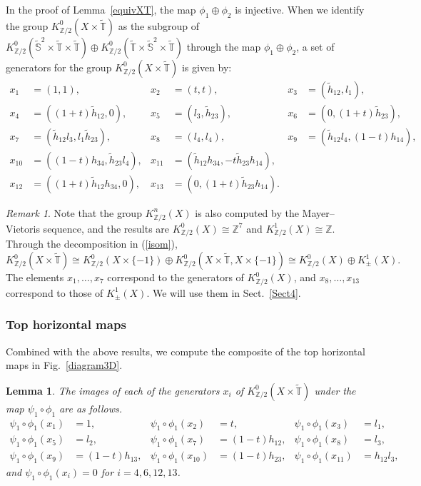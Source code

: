 \documentclass{amsart}
\theoremstyle{plain}
\newtheorem{lemma}[theorem]{Lemma}
\theoremstyle{definition}
\theoremstyle{remark}
\newtheorem{remark}[theorem]{Remark}
\newcommand{\Z}{\mathbb{Z}}
\newcommand{\T}{\mathbb{T}}
\newcommand{\SSS}{\mathbb{S}}
\newcommand{\tT}{\widetilde{\T}}
\newcommand{\tS}{\widetilde{\SSS}}
\newcommand{\thh}{\tilde{h}}
\begin{document}
In the proof of Lemma~\ref{equivXT}, the map $\phi_1 \oplus \phi_2$ is injective.
When we identify the group $K^0_{\Z/2}(X \times \tT)$ as the subgroup of $K^0_{\Z/2}(\tS^2 \times \tT \times \tT) \oplus K^0_{\Z/2}(\tT \times \tS^2 \times \tT)$ through the map $\phi_1 \oplus \phi_2$, a set of generators for the group $K^0_{\Z/2}(X \times \tT)$ is given by:
\begin{align*}
x_1 &= (1,1), &
x_2 &= (t, t), &
x_3 &= (\thh_{12}, l_1),
\\
x_4 &= ((1+t)\thh_{12},0), &
x_5 &= (l_3, \thh_{23}), &
x_6 &= (0, (1+t)\thh_{23}),
\\
x_7 &= (\thh_{12}l_3, l_1 \thh_{23}), &
x_8 &= (l_4, l_4), &
x_9 &= (\thh_{12} l_4, (1-t)h_{14}),
\\
x_{10} &= ((1-t)h_{34}, \thh_{23}l_4), &
x_{11} &= (\thh_{12}h_{34}, -t \thh_{23}h_{14}), & &
\\
x_{12} &= ((1+t)\thh_{12}h_{34},0),
& x_{13} &= (0, (1+t) \thh_{23}h_{14}). &
\end{align*}

\begin{remark}
\label{rem3.14}
Note that the group $K^n_{\Z/2}(X)$ is also computed by the Mayer--Vietoris sequence, and the results are $K^0_{\Z/2}(X) \cong \Z^7$ and $K^1_{\Z/2}(X) \cong \Z$.
Through the decomposition in (\ref{isom}),
\begin{equation*}
	K^0_{\Z/2}(X \times \tT) \cong K^0_{\Z/2}(X \times \{ -1 \}) \oplus K^0_{\Z/2}(X \times \tT, X \times \{-1\})
		\cong K^0_{\Z/2}(X) \oplus K^1_\pm(X).
\end{equation*}
The elements $x_1, \ldots, x_7$ correspond to the generators of $K^0_{\Z/2}(X)$, and $x_8, \ldots, x_{13}$ correspond to those of $K^1_\pm(X)$. We will use them in Sect.~\ref{Sect4}.
\end{remark}

\subsubsection{Top horizontal maps}
Combined with the above results, we compute the composite of the top horizontal maps in Fig.~\ref{diagram3D}.

\begin{lemma}
\label{image3D}
The images of each of the generators $x_i$ of $K^0_{\Z/2}(X \times \tT)$ under the map $\psi_1 \circ \phi_1$ are as follows.
\begin{align*}
\psi_1 \circ \phi_1 (x_1) &= 1, &
\psi_1 \circ \phi_1 (x_2) &= t, &
\psi_1 \circ \phi_1 (x_3) &= l_1,
\\
\psi_1 \circ \phi_1 (x_5) &= l_2, &
\psi_1 \circ \phi_1 (x_7) &= (1-t)h_{12}, &
\psi_1 \circ \phi_1 (x_8) &= l_3,
\\
\psi_1 \circ \phi_1 (x_9) &= (1-t)h_{13}, &
\psi_1 \circ \phi_1 (x_{10}) &= (1-t)h_{23}, &
\psi_1 \circ \phi_1 (x_{11}) &= h_{12} l_3,
\end{align*}
and $\psi_1 \circ \phi_1 (x_i) = 0$ for $i=4,6,12,13$.
\end{lemma}
\end{document}

